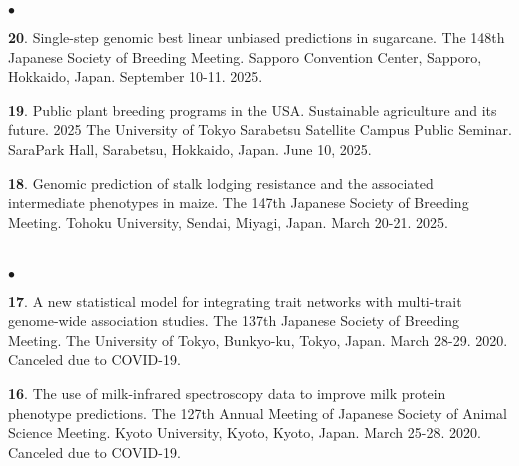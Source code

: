 \documentclass[margin,line,10pt]{res}
\newenvironment{list2}{
  \begin{list}{$\bullet$}{%
      \setlength{\itemsep}{0in}
      \setlength{\parsep}{0in} \setlength{\parskip}{0in}
      \setlength{\topsep}{0in} \setlength{\partopsep}{0in} 
      \setlength{\leftmargin}{0.2in}}}{\end{list}}
\begin{document}
\begin{resume}
\begin{list2}
  \vspace{0.5cm}

  \item [{\bf 20}.] Single-step genomic best linear unbiased predictions in sugarcane. The 148th Japanese Society of Breeding Meeting. Sapporo Convention Center, Sapporo, Hokkaido, Japan. September 10-11. 2025. %


  \vspace{0.5cm}

  \item [{\bf 19}.] Public plant breeding programs in the USA. Sustainable agriculture and its future. 2025 The University of Tokyo Sarabetsu Satellite Campus Public Seminar. SaraPark Hall, Sarabetsu, Hokkaido, Japan. June 10, 2025. %


  \vspace{0.5cm}

  \item [{\bf 18}.] Genomic prediction of stalk lodging resistance and the associated intermediate phenotypes in maize. The 147th Japanese Society of Breeding Meeting.  Tohoku University, Sendai, Miyagi, Japan. March 20-21. 2025. 
     
\end{list2}  


\section{}
\begin{list2}

  \item [{\bf 17}.] A new statistical model for integrating trait networks with multi-trait genome-wide association studies. The 137th Japanese Society of Breeding Meeting.  The University of Tokyo, Bunkyo-ku, Tokyo, Japan. March 28-29. 2020. Canceled due to COVID-19.
 
  \vspace{0.5cm}
  
  \item [{\bf 16}.] The use of milk-infrared spectroscopy data to improve milk protein phenotype predictions. The 127th Annual Meeting of Japanese Society of Animal Science Meeting. Kyoto University, Kyoto, Kyoto, Japan. March 25-28. 2020. Canceled due to COVID-19.
  

\end{list2}
\end{resume}
\end{document}
